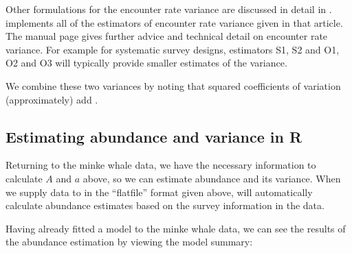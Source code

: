\documentclass[article,shortnames]{jss}
\begin{document}
Other formulations for the encounter rate variance are discussed in
detail in \citet{Fewster:2009ku}.  implements all of the
estimators of encounter rate variance given in that article. The
 manual page gives further advice and technical detail on
encounter rate variance. For example for systematic survey designs,
estimators S1, S2 and O1, O2 and O3 will typically provide smaller
estimates of the variance.

We combine these two variances by noting that squared coefficients of
variation (approximately) add \citep[often referred to as ``the delta
method'';][]{seber2002estimation}.

\subsection{Estimating abundance and variance in
R}\label{estimating-abundance-and-variance-in-r}

Returning to the minke whale data, we have the necessary information to
calculate \(A\) and \(a\) above, so we can estimate abundance and its
variance. When we supply data to  in the ``flatfile'' format
given above,  will automatically calculate abundance estimates
based on the survey information in the data.

Having already fitted a model to the minke whale data, we can see the
results of the abundance estimation by viewing the model summary:
\end{document}
